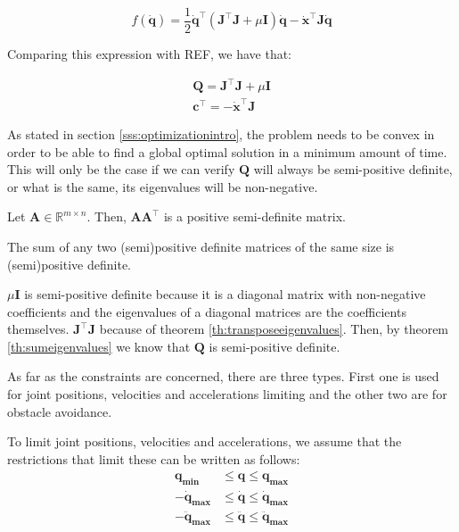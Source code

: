 \begin{equation*}
    f(\dot{\mathbf{q}}) = \frac{1}{2}\dot{\mathbf{q}}^{\top}\left(\mathbf{J}^{\top} \mathbf{J}+\mu \mathbf{I}\right) \dot{\mathbf{q}}-\dot{\mathbf{x}}^{\top} \mathbf{J} \dot{\mathbf{q}}
\end{equation*}

Comparing this expression with REF, we have that:

\begin{equation*}
    \begin{array}{l}
        \mathbf{Q} = \mathbf{J}^{\top} \mathbf{J}+\mu \mathbf{I} \\
        \mathbf{c}^{\top} = -\dot{\mathbf{x}}^{\top} \mathbf{J}
    \end{array}
\end{equation*}

As stated in section \ref{sss:optimizationintro}, the problem needs to be convex in order to be able to find a global optimal solution in a minimum amount of time. This will only be the case if we can verify $\mathbf{Q}$ will always be semi-positive definite, or what is the same, its eigenvalues will be non-negative.

\begin{theorem}
    \label{th:transposeeigenvalues}
    Let $\mathbf{A} \in \mathbb{R}^{m \times n}$. Then, $\mathbf{A} \mathbf{A} ^{\top}$ is a positive semi-definite matrix.
\end{theorem}

\begin{theorem}
    \label{th:sumeigenvalues}
    The sum of any two (semi)positive definite matrices of the same size is (semi)positive definite.
\end{theorem}

$\mu \mathbf{I}$ is semi-positive definite because it is a diagonal matrix with non-negative coefficients and the eigenvalues of a diagonal matrices are the coefficients themselves. $\mathbf{J}^{\top} \mathbf{J}$ because of theorem \ref{th:transposeeigenvalues}. Then, by theorem \ref{th:sumeigenvalues} we know that $\mathbf{Q}$ is semi-positive definite.


As far as the constraints are concerned, there are three types. First one is used for joint positions, velocities and accelerations limiting and the other two are for obstacle avoidance.

To limit joint positions, velocities and accelerations, we assume that the restrictions that limit these can be written as follows:
$$
\begin{aligned}
    \mathbf{q_{\min}} & \leq \mathbf{q} \leq \mathbf{q_{\max}} \\
    -\mathbf{\dot{q}_{\max}} & \leq \mathbf{\dot{q}} \leq \mathbf{\dot{q}_{\max}} \\
    -\mathbf{\ddot{q}_{\max}} & \leq \mathbf{\ddot{q}} \leq \mathbf{\ddot{q}_{\max}}
\end{aligned}
$$

